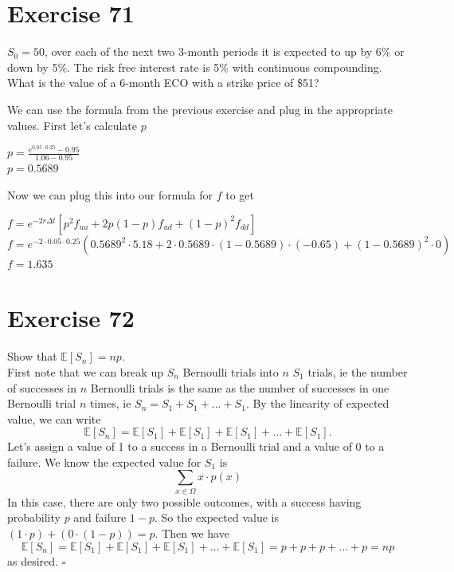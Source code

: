 \documentclass{article}
\begin{document}
\section*{Exercise 71}
$S_0 = 50$, over each of the next two 3-month periods it is expected to up by 6\% or down by 5\%. The risk free interest rate is 5\% with continuous compounding. What is the value of a 6-month ECO with a strike price of \$51?
\begin{flushleft}
    We can use the formula from the previous exercise and plug in the appropriate values.
    First let's calculate $p$
    \begin{center}
        $p = \frac{e^{0.05 \cdot 0.25} - 0.95}{1.06 - 0.95}$ \\
        $p = 0.5689$
    \end{center}
    Now we can plug this into our formula for $f$ to get
   \begin{center}
        $f = e^{-2r\Delta t}[p^2f_{uu} + 2p(1-p)f_{ud} + (1-p)^2f_{dd}]$ \\
        $f = e^{-2 \cdot 0.05 \cdot 0.25} (0.5689^2 \cdot 5.18 + 2 \cdot 0.5689 \cdot (1 - 0.5689) \cdot (-0.65) + (1-0.5689)^2 \cdot 0)$ \\
        $f = 1.635$
    \end{center}
\end{flushleft}

\section*{Exercise 72}
\begin{flushleft}
    Show that $\mathbb{E}[S_n] = np$. \\
    First note that we can break up $S_n$ Bernoulli trials into $n$ $S_1$ trials, ie the number of successes in $n$ Bernoulli trials is the same as the number of successes in one Bernoulli trial $n$ times, ie
    $S_n = S_1 + S_1 + ... + S_1$. By the linearity of expected value, we can write
    \begin{equation*}
        \mathbb{E}[S_n] = \mathbb{E}[S_1] + \mathbb{E}[S_1] + \mathbb{E}[S_1] + ... + \mathbb{E}[S_1].
    \end{equation*}
    Let's assign a value of 1 to a success in a Bernoulli trial and a value of 0 to a failure. We know the expected value for $S_1$ is \\
    \begin{equation*}
        \sum_{x \in \Omega}{x \cdot p(x)}
    \end{equation*}
    In this case, there are only two possible outcomes, with a success having probability $p$ and failure $1-p$. So the expected value is $(1 \cdot p) + (0 \cdot (1-p)) = p$. 
    Then we have
    \begin{equation*}
        \mathbb{E}[S_n] = \mathbb{E}[S_1] + \mathbb{E}[S_1] + \mathbb{E}[S_1] + ... + \mathbb{E}[S_1] = p + p + p + ... + p = np
    \end{equation*}
    as desired. $\square$
\end{flushleft}
\end{document}
